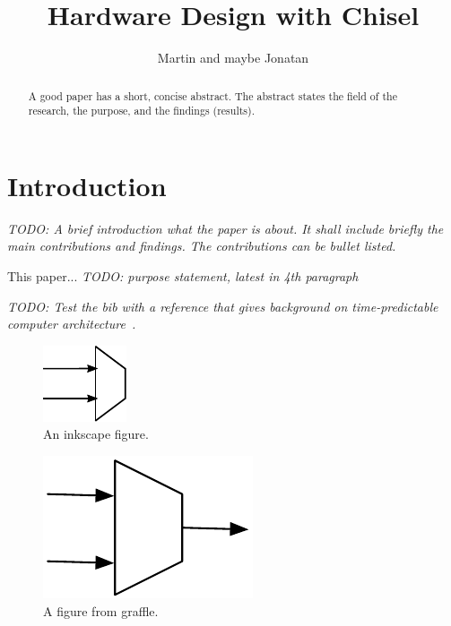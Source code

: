 \documentclass[a4paper,twocolumn]{article}
\newcommand{\todo}[1]{{\emph{TODO: #1}}}
\begin{document}
\title{Hardware Design with Chisel}

\author{Martin and maybe Jonatan}




\maketitle \thispagestyle{empty}

\begin{abstract}
A good paper has a short, concise abstract. The abstract
states the field of the research, the purpose, and the findings (results).
\end{abstract}


\section{Introduction}
\label{sec:intro}

\todo{A brief introduction what the paper is about. It shall include briefly the
main contributions and findings. The contributions can be bullet listed.}

This paper... \todo{purpose statement, latest in 4th paragraph}

\todo{Test the bib with a reference that gives background on time-predictable
computer architecture~\cite{tpca:jes}.}


\begin{figure}
  \centering
  \includegraphics{figures/broken-mux}

  \caption{An inkscape figure.}
  \label{fig:mux}
\end{figure}

\begin{figure}
  \centering
  \includegraphics{figures/mux}

  \caption{A figure from graffle.}
  \label{fig:mux}
\end{figure}
\end{document}
